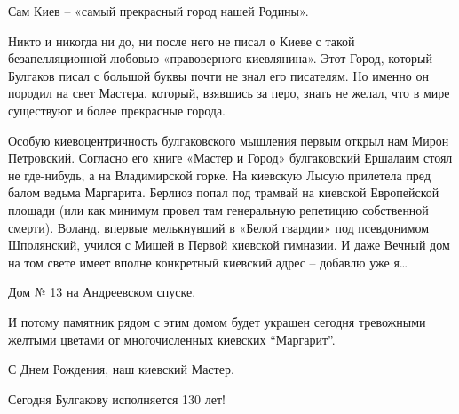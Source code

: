 Сам Киев – «самый прекрасный город нашей Родины». 

Никто и никогда ни до, ни после него не писал о Киеве с такой
безапелляционной любовью «правоверного киевлянина». Этот Город, который
Булгаков писал с большой буквы почти не знал его писателям. Но именно
он породил на свет Мастера, который, взявшись за перо, знать не желал,
что в мире существуют и более прекрасные города.

Особую киевоцентричность булгаковского мышления первым открыл нам Мирон
Петровский. Согласно его книге «Мастер и Город» булгаковский Ершалаим стоял не
где-нибудь, а на Владимирской горке. На киевскую Лысую прилетела пред балом
ведьма Маргарита. Берлиоз попал под трамвай на киевской Европейской площади
(или как минимум провел там генеральную репетицию собственной смерти). Воланд,
впервые мелькнувший в «Белой гвардии» под псевдонимом Шполянский, учился с
Мишей в Первой киевской гимназии.  И даже Вечный дом на том свете имеет вполне
конкретный киевский адрес – добавлю уже я… 

Дом № 13 на Андреевском спуске. 

И потому памятник рядом с этим домом будет украшен сегодня тревожными желтыми
цветами от многочисленных киевских \enquote{Маргарит}.

С Днем Рождения, наш киевский Мастер. 

Сегодня Булгакову исполняется 130 лет!
